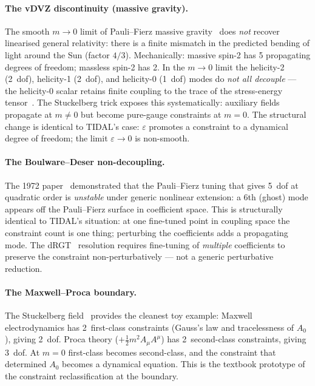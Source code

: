 \paragraph{The vDVZ discontinuity (massive gravity).}
The smooth $m \to 0$ limit of Pauli--Fierz massive
gravity~\cite{vanDamVeltman1970,Zakharov1970} does \emph{not} recover
linearised general relativity: there is a finite mismatch in the
predicted bending of light around the Sun (factor $4/3$).  Mechanically:
massive spin-2 has 5 propagating degrees of freedom; massless spin-2 has
2.  In the $m \to 0$ limit the helicity-2 (2~dof), helicity-1 (2~dof),
and helicity-0 (1~dof) modes do \emph{not all decouple} --- the helicity-0
scalar retains finite coupling to the trace of the stress-energy
tensor~\cite[\S III]{Hinterbichler2012}.  The Stuckelberg trick exposes
this systematically: auxiliary fields propagate at $m \ne 0$ but become
pure-gauge constraints at $m = 0$.  The structural change is identical to
TIDAL's case: $\varepsilon$ promotes a constraint to a dynamical degree of
freedom; the limit $\varepsilon \to 0$ is non-smooth.

\paragraph{The Boulware--Deser non-decoupling.}
The 1972 paper~\cite{BoulwareDeser1972} demonstrated that the
Pauli--Fierz tuning that gives 5~dof at quadratic order is \emph{unstable}
under generic nonlinear extension: a 6th (ghost) mode appears off the
Pauli--Fierz surface in coefficient space.  This is structurally identical
to TIDAL's situation: at one fine-tuned point in coupling space the
constraint count is one thing; perturbing the coefficients adds a
propagating mode.  The dRGT~\cite{deRham2014} resolution requires
fine-tuning of \emph{multiple} coefficients to preserve the constraint
non-perturbatively --- not a generic perturbative reduction.

\paragraph{The Maxwell--Proca boundary.}
The Stuckelberg field~\cite{RueggRuizAltaba2003} provides the cleanest
toy example: Maxwell electrodynamics has 2~first-class constraints
(Gauss's law and tracelessness of $A_0$), giving 2~dof.  Proca theory
($+\frac{1}{2}m^2 A_\mu A^\mu$) has 2~second-class constraints, giving
3~dof.  At $m = 0$ first-class becomes second-class, and the constraint
that determined $A_0$ becomes a dynamical equation.  This is the textbook
prototype of the constraint reclassification at the boundary.

